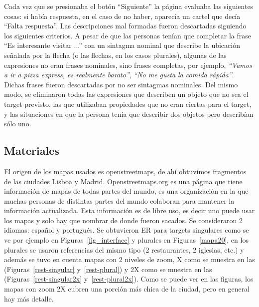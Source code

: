 Cada vez que se presionaba el bot\'on ``Siguiente'' la p\'agina evaluaba las siguientes cosas: si hab\'ia respuesta, en el caso de no haber, aparec\'ia un cartel que dec\'ia ``Falta respuesta''.
Las descripciones mal formadas fueron descartadas siguiendo los siguientes criterios. A pesar de que las personas ten\'{i}an que completar la frase ``Es interesante visitar ...'' con un sintagma nominal que describe la ubicaci\'on se\~nalada por la flecha (o las flechas, en los casos plurales), algunas de las expresiones no eran frases nominales, sino frases completas, por ejemplo, \emph{``Vamos a ir a pizza express, es realmente barato''}, \emph{``No me gusta la comida r\'apida''}. Dichas frases fueron descartadas por no ser sintagmas nominales. Del mismo modo, se eliminaron todas las expresiones que describen un objeto que no sea el target previsto, las que utilizaban propiedades que no eran ciertas para el target, y las situaciones en que la persona ten\'{i}a que describir dos objetos pero describ\'ian s\'olo uno.



\subsection{Materiales}
\label{corpus-materiales}

El origen de los mapas usados es openstreetmaps, de ah\'i obtuvimos fragmentos de las ciudades Lisboa y Madrid. Openstreetmaps.org es una p\'agina que tiene informaci\'on de mapas de todas partes del mundo, es una organizaci\'on en la que muchas personas de distintas partes del mundo colaboran para mantener la informaci\'on actualizada. Esta informaci\'on es de libre uso, es decir uno puede usar los mapas y solo hay que nombrar de donde fueron sacados.
Se consideraron 2 idiomas: espa\~nol y portugu\'es. Se obtuvieron ER para targets singulares como se ve por ejemplo en Figuras~\ref{fig_interface} y plurales en Figuras~\ref{mapa20}, en los plurales se usaron referencias del mismo tipo (2 restaurantes, 2 iglesias, etc.) y adem\'as se tuvo en cuenta mapas con 2 niveles de zoom, X como se muestra en las (Figuras~\ref{rest-singular} y~\ref{rest-plural}) y 2X como se muestra en las (Figuras~\ref{rest-singular2x} y~\ref{rest-plural2x}). Como se puede ver en las figuras, los mapas con zoom 2X cubren una porci\'on m\'as chica de la ciudad, pero en general hay m\'as detalle.

